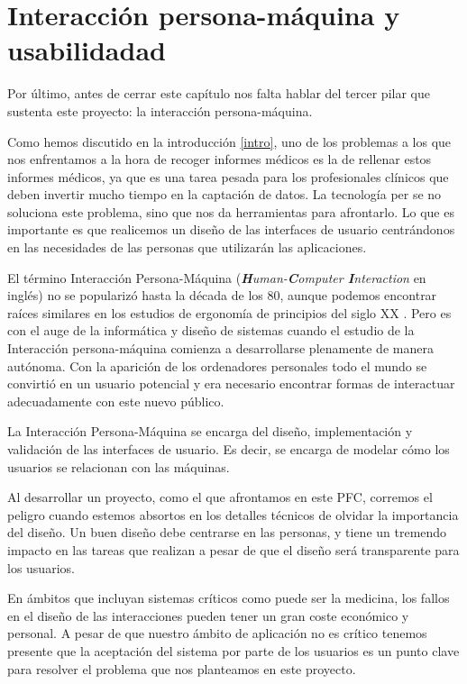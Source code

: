 \section{Interacción persona-máquina y usabilidadad}\label{sec:UI}
Por último, antes de cerrar este capítulo nos falta hablar del tercer pilar que sustenta este proyecto: la interacción persona-máquina.\par
Como hemos discutido en la introducción \ref{intro}, uno de los problemas a los que nos enfrentamos a la hora de recoger informes médicos es la de rellenar estos informes médicos, ya que es una tarea pesada para los profesionales clínicos que deben invertir mucho tiempo en la captación de datos. La tecnología per se no soluciona este problema, sino que nos da herramientas para afrontarlo. Lo que es importante es que realicemos un diseño de las interfaces de usuario centrándonos en las necesidades de las personas que utilizarán las aplicaciones.\medskip\par
El término Interacción Persona-Máquina (\textit{\textbf{H}uman-\textbf{C}omputer \textbf{I}nteraction} en inglés) no se popularizó hasta la década de los 80, aunque podemos encontrar raíces similares en los estudios de ergonomía de principios del siglo XX \cite{dix2004human}. Pero es con el auge de la informática y diseño de sistemas cuando el estudio de la Interacción persona-máquina comienza a desarrollarse plenamente de manera autónoma. Con la aparición de los ordenadores personales todo el mundo se convirtió en un usuario potencial y era necesario encontrar formas de interactuar adecuadamente con este nuevo público. \par
La Interacción Persona-Máquina se encarga del diseño, implementación y validación de las interfaces de usuario. Es decir, se encarga de modelar cómo los usuarios se relacionan con las máquinas.\medskip\par
Al desarrollar un proyecto, como el que afrontamos en este PFC, corremos el peligro cuando estemos absortos en los detalles técnicos de olvidar la importancia del diseño. Un buen diseño debe centrarse en las personas, y tiene un tremendo impacto en las tareas que realizan a pesar de que el diseño será transparente para los usuarios.\par
En ámbitos que incluyan sistemas críticos como puede ser la medicina, los fallos en el diseño de las interacciones pueden tener un gran coste económico y personal. A pesar de que nuestro ámbito de aplicación no es crítico tenemos presente que la aceptación del sistema por parte de los usuarios es un punto clave para resolver el problema que nos planteamos en este proyecto.\medskip \par
